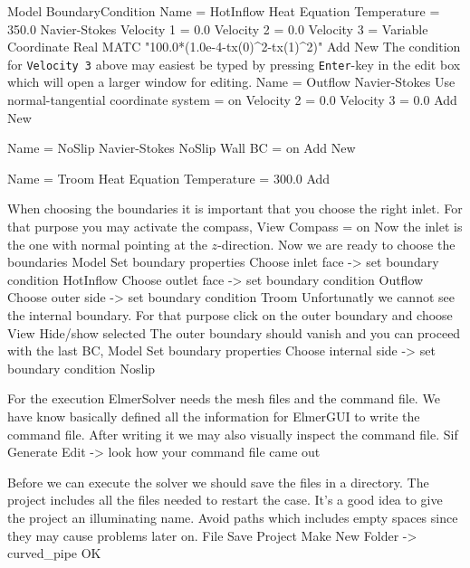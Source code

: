\ttbegin
Model
  BoundaryCondition
    Name = HotInflow
    Heat Equation
      Temperature = 350.0
    Navier-Stokes 
      Velocity 1 = 0.0
      Velocity 2 = 0.0
      Velocity 3 = Variable Coordinate 
        Real MATC "100.0*(1.0e-4-tx(0)^2-tx(1)^2)"
    Add
    New
\ttend
The condition for \texttt{Velocity 3} above may easiest be typed by pressing \texttt{Enter}-key in the
edit box which will open a larger window for editing.
\ttbegin
    Name = Outflow
    Navier-Stokes 
      Use normal-tangential coordinate system = on
      Velocity 2 = 0.0
      Velocity 3 = 0.0
    Add
    New

    Name = NoSlip
    Navier-Stokes 
      NoSlip Wall BC = on
    Add 
    New
 
    Name = Troom
    Heat Equation
      Temperature = 300.0
    Add
\ttend   

When choosing the boundaries it is important that you choose the right inlet.
For that purpose you may activate the compass, 
\ttbegin
View
  Compass = on
\ttend
Now the inlet is the one with normal pointing at the $z$-direction.
Now we are ready to choose the boundaries 
\ttbegin
Model
  Set boundary properties
    Choose inlet face -> set boundary condition HotInflow
    Choose outlet face -> set boundary condition Outflow
    Choose outer side -> set boundary condition Troom
\ttend
Unfortunatly we cannot see the internal boundary. For that purpose click on the 
outer boundary and choose 
\ttbegin
View
  Hide/show selected
\ttend
The outer boundary should vanish and you can
proceed with the last BC,
\ttbegin
Model
  Set boundary properties
    Choose internal side -> set boundary condition Noslip
\ttend


For the execution 
ElmerSolver needs the mesh files and the command file. We have know basically defined
all the information for ElmerGUI to write the command file. After writing it we may also visually 
inspect the command file.
\ttbegin
Sif 
  Generate
  Edit -> look how your command file came out  
\ttend

Before we can execute the solver we should save the files in a directory. The project includes
all the files needed to restart the case. It's a good idea to give the project an illuminating name.
Avoid paths which includes empty spaces since they may cause problems later on. 
\ttbegin
File 
  Save Project
    Make New Folder -> curved_pipe
    OK
\ttend

